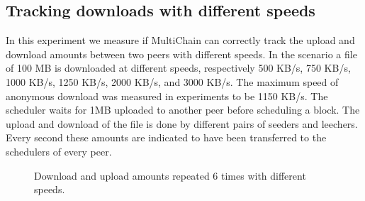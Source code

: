 \subsection{Tracking downloads with different speeds}
In this experiment we measure if MultiChain can correctly track the upload and download amounts
between two peers with different speeds.
In the scenario a file of 100 MB is downloaded at different speeds,
respectively 500 KB/s, 750 KB/s, 1000 KB/s, 1250 KB/s, 2000 KB/s, and 3000 KB/s.
The maximum speed of anonymous download was measured in experiments to be 1150 KB/s\cite{ruigrok-anonymous}.
The scheduler waits for 1MB uploaded to another peer before scheduling a block.
The upload and download of the file is done by different pairs of seeders and leechers.
Every second these amounts are indicated to have been transferred to the schedulers of every peer.

\begin{figure}
\centering
{}
\caption{Download and upload amounts repeated 6 times with different speeds.}
\label{fig:synthetic-simple-amounts}
\end{figure}

